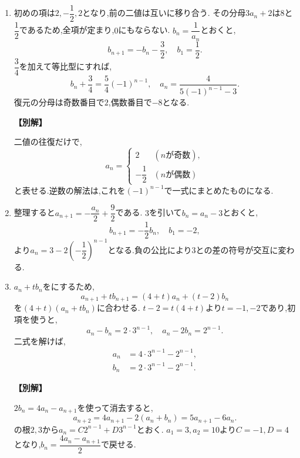 \begin{enumerate}[label=\textbf{問\arabic*.},leftmargin=3.8em,format=\bookitemlink{practice-basic}{solution}{problem}]
          \item 初めの項は$2,-\dfrac{1}{2},2$となり,前の二値は互いに移り合う.
                  その分母$3a_n+2$は$8$と$\dfrac{1}{2}$であるため,全項が定まり,$0$にもならない.
                  $b_n=\dfrac{1}{a_n}$とおくと,
                  \[
                    b_{n+1}=-b_n-\frac32,\quad b_1=\frac12.
                  \]
                  $\dfrac{3}{4}$を加えて等比型にすれば,
                  \[
                    b_n+\frac34=\frac54(-1)^{n-1},\quad
                    a_n=\frac4{5(-1)^{n-1}-3}.
                  \]
                  復元の分母は奇数番目で$2$,偶数番目で$-8$となる.
                  \par\smallskip\noindent\textbf{【別解】}\par
                  二値の往復だけで,
                  \[
                    a_n=\begin{cases}
                      2&(n\text{が奇数}),\\
                      -\dfrac{1}{2}&(n\text{が偶数})
                    \end{cases}
                  \]
                  と表せる.逆数の解法は,これを$(-1)^{n-1}$で一式にまとめたものになる.

          \item 整理すると$a_{n+1}=-\dfrac{a_n}{2}+\dfrac{9}{2}$である.
                  $3$を引いて$b_n=a_n-3$とおくと,
                  \[
                    b_{n+1}=-\frac12b_n,\quad b_1=-2,
                  \]
                  より$a_n=3-2\left(-\dfrac{1}{2}\right)^{n-1}$となる.負の公比により$3$との差の符号が交互に変わる.

          \item $a_n+t b_n$をにするため,
                  \[
                    a_{n+1}+t b_{n+1}=(4+t)a_n+(t-2)b_n
                  \]
                  を$(4+t)(a_n+t b_n)$に合わせる.
                  $t-2=t(4+t)$より$t=-1,-2$であり,初項を使うと,
                  \[
                    a_n-b_n=2\cdot3^{n-1},\quad a_n-2b_n=2^{n-1}.
                  \]
                  二式を解けば,
                  \[
                    \begin{aligned}
                    a_n&=4\cdot3^{n-1}-2^{n-1},\\
                    b_n&=2\cdot3^{n-1}-2^{n-1}.
                    \end{aligned}
                  \]
                  \par\smallskip\noindent\textbf{【別解】}\par
                  $2b_n=4a_n-a_{n+1}$を使って消去すると,
                  \[
                    a_{n+2}=4a_{n+1}-2(a_n+b_n)=5a_{n+1}-6a_n.
                  \]
                  の根$2,3$から$a_n=C2^{n-1}+D3^{n-1}$とおく.
                  $a_1=3,a_2=10$より$C=-1,D=4$となり,$b_n=\dfrac{4a_n-a_{n+1}}{2}$で戻せる.


\end{enumerate}

